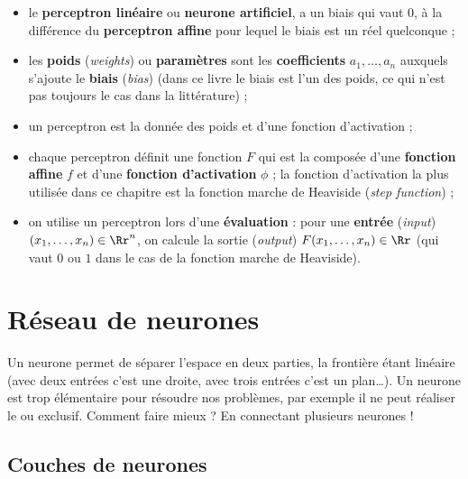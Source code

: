 \documentclass[11pt,class=report,crop=false]{standalone}
\begin{document}
\begin{itemize}
  \item le \textbf{perceptron linéaire} ou \textbf{neurone artificiel}, a un biais qui vaut $0$, à la différence du \textbf{perceptron affine} pour lequel le biais est un réel quelconque ;
   
  \item les \textbf{poids} (\emph{weights}) ou \textbf{paramètres} sont les \textbf{coefficients} $a_1,\ldots,a_n$ auxquels s'ajoute le \textbf{biais} (\emph{bias}) (dans ce livre le biais est l'un des poids, ce qui n'est pas toujours le cas dans la littérature) ;
  
  \item un perceptron est la donnée des poids et d'une fonction d'activation ;
  
  \item chaque perceptron définit une fonction $F$ qui est la composée d'une \textbf{fonction affine} $f$ et d'une \textbf{fonction d'activation} $\phi$ ; 
  la fonction d'activation la plus utilisée dans ce chapitre est la fonction marche de Heaviside (\emph{step function}) ; 
  
  \item on utilise un perceptron lors d'une \textbf{évaluation} : pour une \textbf{entrée} (\emph{input})
  $(x_1,\ldots,x_n) \in \Rr^n$, on calcule la sortie (\emph{output}) $F(x_1,\ldots,x_n) \in \Rr$ (qui vaut $0$ ou $1$ dans le cas de la fonction marche de Heaviside).  
\end{itemize}




\section{Réseau de neurones}

Un neurone permet de séparer l'espace en deux parties, la frontière étant linéaire (avec deux entrées c'est une droite, avec trois entrées c'est un plan\ldots). Un neurone est trop élémentaire pour résoudre nos problèmes, par exemple il ne peut réaliser le \og{}ou exclusif\fg{}. Comment faire mieux ? En connectant plusieurs neurones !

\subsection{Couches de neurones}
\end{document}
